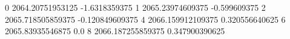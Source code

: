 0 2064.20751953125 -1.6318359375
1 2065.23974609375 -0.599609375
2 2065.718505859375 -0.120849609375
4 2066.159912109375 0.320556640625
6 2065.83935546875 0.0
8 2066.187255859375 0.347900390625
